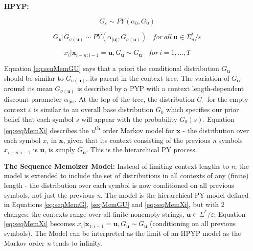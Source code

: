 \textbf{HPYP:}

\begin{equation}
G_{\varepsilon}\sim PY(\alpha_{0}, G_{0})
\label{eq:seqMemG}
\end{equation}

\begin{equation}
G_{\textbf{u}}|G_{\sigma(\textbf{u})}\sim PY(\alpha_{|\textbf{u}|}, G_{\sigma(\textbf{u})}) \ \ \ \  for\ all\ \textbf{u} \in \Sigma_{n}^{*}/\varepsilon
\label{eq:seqMemGU}
\end{equation}

\begin{equation}
x_{i}|\textbf{x}_{i-n:i-1}=\textbf{u}, G_{\textbf{u}}\sim G_{\textbf{u}} \ \ \ \  for\ i=1, ..., T
\label{eq:seqMemXi}
\end{equation}

\noindent Equation \ref{eq:seqMemGU} says that a priori the conditional distribution $G_{\textbf{u}}$ should be similar to $G_{\sigma(\textbf{u})}$, its parent in the context tree. The variation of $G_{\textbf{u}}$ around its mean $G_{\sigma(\textbf{u})}$ is described by a PYP with a context length-dependent discount parameter $\alpha_{|\textbf{u}|}$. At the top of the tree, the distribution $G_{\varepsilon}$ for the empty context $\varepsilon$ is similar to an overall base distribution $G_{0}$ which specifies our prior belief that each symbol $s$ will appear with the probability $G_{0}(s)$. Equation \ref{eq:seqMemXi} describes the \textit{n}\textsuperscript{th} order Markov model for $\textbf{x}$ - the distribution over each symbol $x_{i}$ in $\textbf{x}$, given that its context consisting of the previous \textit{n} symbols $x_{i-n:i-1}$ is $\textbf{u}$, is simply $G_{\textbf{u}}$. This is the hierarchical PY process.

\textbf{The Sequence Memoizer Model:} Instead of limiting context lengths to \textit{n}, the model is extended to include the set of distributions in all contexts of any (finite) length - the distribution over each symbol is now conditioned on all previous symbols, not just the previous \textit{n}. The model is the hierarchical PY model defined in Equations \ref{eq:seqMemG}, \ref{seqMemGU} and \ref{eq:seqMemXi}, but with 2 changes: the contexts range over all finite nonempty strings, $\textbf{u}\in \Sigma^{*}/\varepsilon$; Equation \ref{eq:seqMemXi} becomes $x_{i}|\textbf{x}_{1:i-1}=\textbf{u}, G_{\textbf{u}}\sim G_{\textbf{u}}$ (conditioning on all previous symbols). The Model can be interpreted as the limit of an HPYP model as the Markov order \textit{n} tends to infinity.


